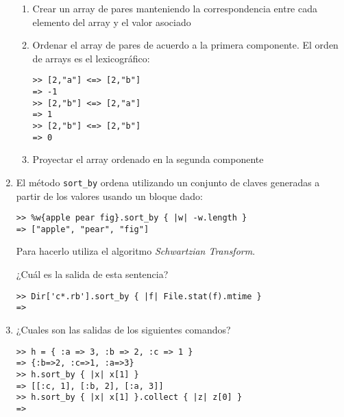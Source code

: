 \begin{enumerate}
\begin{enumerate}
\item Crear un array de pares manteniendo la correspondencia entre cada elemento del array y el valor asociado
\item Ordenar el array de pares de acuerdo a la primera componente. El orden de arrays es el lexicográfico:
\begin{verbatim}
>> [2,"a"] <=> [2,"b"]
=> -1
>> [2,"b"] <=> [2,"a"]
=> 1
>> [2,"b"] <=> [2,"b"]
=> 0
\end{verbatim}
\item Proyectar el array ordenado en la segunda componente
\end{enumerate}
\item El método \verb|sort_by| ordena utilizando un conjunto de claves generadas a partir de los valores
usando un bloque dado:
\begin{verbatim}
>> %w{apple pear fig}.sort_by { |w| -w.length }
=> ["apple", "pear", "fig"]
\end{verbatim}
Para hacerlo utiliza el algoritmo {\it Schwartzian Transform}.

¿Cuál es la salida de esta sentencia?
\begin{verbatim}
>> Dir['c*.rb'].sort_by { |f| File.stat(f).mtime }
=> 
\end{verbatim}
\item
¿Cuales son las salidas de los siguientes comandos?
\begin{verbatim}
>> h = { :a => 3, :b => 2, :c => 1 }
=> {:b=>2, :c=>1, :a=>3}
>> h.sort_by { |x| x[1] }
=> [[:c, 1], [:b, 2], [:a, 3]]
>> h.sort_by { |x| x[1] }.collect { |z| z[0] }
=> 
\end{verbatim}

\end{enumerate}


